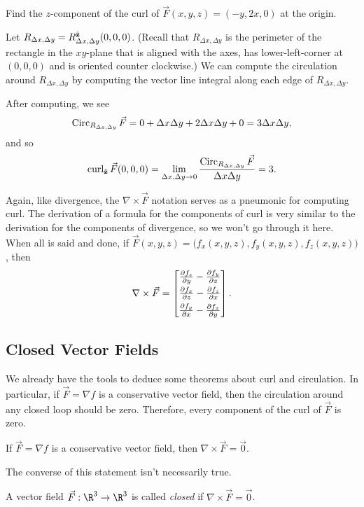 \begin{example}
	Find the $z$-component of the curl of $\vec F(x,y,z) = (-y, 2x, 0)$ at the origin.
	
	Let $R_{\Delta x,\Delta y}=R^{{\hat {\mathbf z}}}_{\Delta x,\Delta y}(0,0,0)$. (Recall that $R_{\Delta x,\Delta y}$
	is the perimeter of the rectangle in the $xy$-plane that is aligned with the axes, has lower-left-corner
	at $(0,0,0)$ and is oriented counter clockwise.)  We can compute the circulation around $R_{\Delta x,\Delta y}$
	by computing the vector line integral along each edge of $R_{\Delta x,\Delta y}$.

	After computing, we see
	\[
		\operatorname{Circ}_{R_{\Delta x,\Delta y}}\vec F = 0 + \Delta x\Delta y+ 2\Delta x\Delta y+0 = 3\Delta x\Delta y,
	\]
	and so
	\[
		\operatorname{curl}_{{\hat {\mathbf z}}}\vec F(0,0,0) = \lim_{\Delta x,\Delta y\to 0} \frac{\operatorname{Circ}_{R_{\Delta x,\Delta y}}\vec F}
		{\Delta x\Delta y} = 3.
	\]
\end{example}

Again, like divergence, the $\nabla \times \vec F$ notation serves as a pneumonic
for computing curl.  The derivation of a formula for the components of curl
is very similar to the derivation for the components of divergence, so we won't go
through it here.  When all is said and done, if $\vec F(x,y,z) = \Big(f_x(x,y,z),f_y(x,y,z),
f_z(x,y,z)\Big)$, then
\[
	\nabla \times \vec F = \mat{
		\tfrac{\partial f_z}{\partial y} - \tfrac{\partial f_y}{\partial z}\\[4pt]
		\tfrac{\partial f_x}{\partial z} - \tfrac{\partial f_z}{\partial x}\\[4pt]
		\tfrac{\partial f_y}{\partial x} - \tfrac{\partial f_x}{\partial y}
		}.
\]

\subsection{Closed Vector Fields}
We already have the tools to deduce some theorems about curl and circulation.
In particular, if $\vec F=\nabla f$ is a conservative vector field, then the circulation
around any closed loop should be zero.  Therefore, every component of the curl of
$\vec F$ is zero.

\begin{theorem}
	If $\vec F=\nabla f$ is a conservative vector field, then $\nabla \times \vec F=\vec 0$.
\end{theorem}

The converse of this statement isn't necessarily true.

\begin{definition}
	A vector field $\vec F:\R^3\to\R^3$ is called \emph{closed}
	if $\nabla \times \vec F=\vec 0$.
\end{definition}

